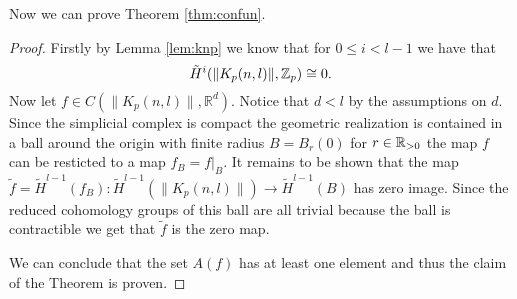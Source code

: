 \noindent Now we can prove Theorem \ref{thm:confun}.
\begin{proof}
  Firstly by Lemma \ref{lem:knp} we know that for $0 \leq i < l-1$ we have that \[\tilde{H}^i(\lVert K_p(n,l) \rVert, \mathbb{Z}_p) \cong 0.\] Now let $f\in C(\lVert K_p(n,l) \rVert, \mathbb{R}^d)$. Notice that $d < l$ by the assumptions on $d$. Since the simplicial complex is compact the geometric realization is contained in a ball around the origin with finite radius $B = B_r(0)$ for $r \in \mathbb{R}_{>0}$ the map $f$ can be resticted to a map $f_B = f|_B$. It remains to be shown that the map $\tilde{f} = \tilde{H}^{l-1}(f_B)\colon \tilde{H}^{l-1}(\lVert K_p(n,l) \rVert) \to \tilde{H}^{l-1}(B)$ has zero image.
  Since the reduced cohomology groups of this ball are all trivial because the ball is contractible we get that $\tilde{f}$ is the zero map.

  We can conclude that the set $A(f)$ has at least one element and thus the claim of the Theorem is proven.
\end{proof}

